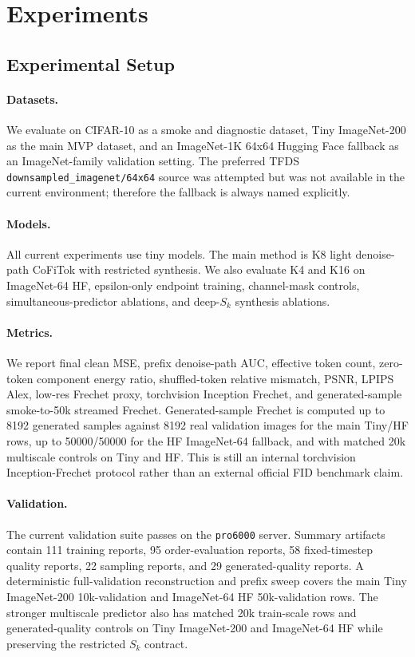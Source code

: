 \documentclass[11pt]{article}
\newcommand{\method}{CoFiTok}
\begin{document}
\section{Experiments}

\subsection{Experimental Setup}

\paragraph{Datasets.}
We evaluate on CIFAR-10 as a smoke and diagnostic dataset, Tiny ImageNet-200 as
the main MVP dataset, and an ImageNet-1K 64x64 Hugging Face fallback as an
ImageNet-family validation setting. The preferred TFDS
\texttt{downsampled\_imagenet/64x64} source was attempted but was not available
in the current environment; therefore the fallback is always named explicitly.

\paragraph{Models.}
All current experiments use tiny models. The main method is K8 light
denoise-path \method{} with restricted synthesis. We also evaluate K4 and K16 on
ImageNet-64 HF, epsilon-only endpoint training, channel-mask controls,
simultaneous-predictor ablations, and deep-$S_k$ synthesis ablations.

\paragraph{Metrics.}
We report final clean MSE, prefix denoise-path AUC, effective token count,
zero-token component energy ratio, shuffled-token relative mismatch, PSNR,
LPIPS Alex, low-res Frechet proxy, torchvision Inception Frechet, and
generated-sample smoke-to-50k streamed Frechet. Generated-sample Frechet is
computed up to 8192 generated samples against 8192 real validation images for
the main Tiny/HF rows, up to 50000/50000 for the HF ImageNet-64 fallback, and
with matched 20k multiscale controls on Tiny and HF.
This is still an internal torchvision Inception-Frechet protocol rather than an
external official FID benchmark claim.

\paragraph{Validation.}
The current validation suite passes on the \texttt{pro6000} server. Summary
artifacts contain 111 training reports, 95 order-evaluation reports, 58
fixed-timestep quality reports, 22 sampling reports, and 29 generated-quality
reports. A deterministic full-validation reconstruction and prefix sweep covers
the main Tiny ImageNet-200 10k-validation and ImageNet-64 HF 50k-validation
rows. The stronger multiscale predictor also has matched 20k train-scale rows
and generated-quality controls on Tiny ImageNet-200 and ImageNet-64 HF while
preserving the restricted $S_k$ contract.
\end{document}
